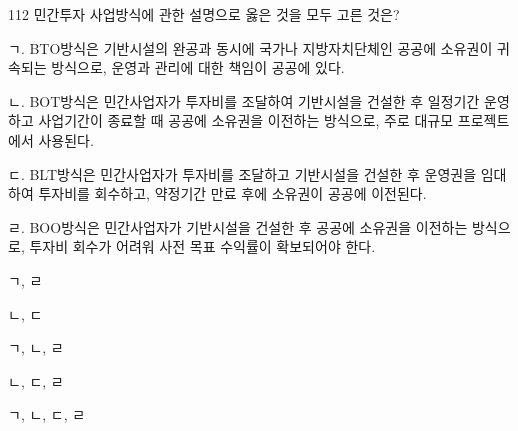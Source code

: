 \begin{question}{112}
민간투자 사업방식에 관한 설명으로 옳은 것을 모두 고른 것은?
\begin{framedtext}
ㄱ. BTO방식은 기반시설의 완공과 동시에 국가나 지방자치단체인 공공에 소유권이 귀속되는 방식으로, 운영과 관리에 대한 책임이 공공에 있다. \par
ㄴ. BOT방식은 민간사업자가 투자비를 조달하여 기반시설을 건설한 후 일정기간 운영하고 사업기간이 종료할 때 공공에 소유권을 이전하는 방식으로, 주로 대규모 프로젝트에서 사용된다. \par
ㄷ. BLT방식은 민간사업자가 투자비를 조달하고 기반시설을 건설한 후 운영권을 임대하여 투자비를 회수하고, 약정기간 만료 후에 소유권이 공공에 이전된다. \par
ㄹ. BOO방식은 민간사업자가 기반시설을 건설한 후 공공에 소유권을 이전하는 방식으로, 투자비 회수가 어려워 사전 목표 수익률이 확보되어야 한다. \par
\end{framedtext}
\begin{choices}
  \item ㄱ, ㄹ
  \item ㄴ, ㄷ
  \item ㄱ, ㄴ, ㄹ
  \item ㄴ, ㄷ, ㄹ
  \item ㄱ, ㄴ, ㄷ, ㄹ
\end{choices}
\end{question}
